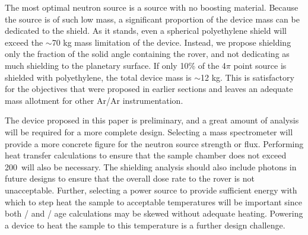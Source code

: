 \documentclass{mc2015}
\begin{document}
The most optimal neutron source is a  source with no boosting material. Because the  source is of such low mass, a significant proportion of the device mass can be dedicated to the shield. As it stands, even a spherical polyethylene shield will exceed the $\sim$70 kg mass limitation of the device. Instead, we propose shielding only the fraction of the  solid angle containing the rover, and not dedicating as much shielding to the planetary surface. If only 10\% of the 4$\pi$ point source is shielded with polyethylene, the total device mass is $\sim$12 kg. This is satisfactory for the objectives that were proposed in earlier sections and leaves an adequate mass allotment for other Ar/Ar instrumentation.

The device proposed in this paper is preliminary, and a great amount of analysis will be required for a more complete design. Selecting a mass spectrometer will provide a more concrete figure for the neutron source strength or flux. Performing heat transfer calculations to ensure that the sample chamber does not exceed 200\celsius\  will also be necessary. The shielding analysis should also include photons in future designs to ensure that the overall dose rate to the rover is not unacceptable. Further, selecting a power source to provide sufficient energy with which to step heat the sample to acceptable temperatures will be important since both / and / age calculations may be skewed without adequate heating.  Powering a device to heat the sample to this temperature is a further design challenge. 
\end{document}
